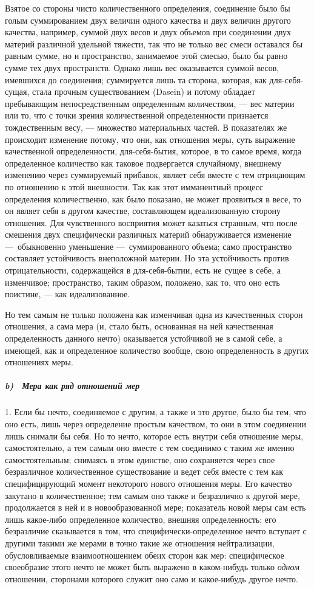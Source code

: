 Взятое со стороны чисто количественного определения, соединение было бы
голым суммированием двух величин одного качества и двух величин другого
качества, например, суммой двух весов и двух объемов при соединении двух
материй различной удельной тяжести, так что не только вес смеси оставался
бы равным сумме, но и пространство, занимаемое этой смесью, было бы равно
сумме тех двух пространств. Однако лишь вес оказывается суммой весов,
имевшихся до соединения; суммируется лишь та сторона, которая, как
для-себя-сущая, стала прочным существованием (Dasein) и потому обладает
пребывающим непосредственным определенным количеством, — вес материи или
то, что с точки зрения количественной определенности признается
тождественным весу, — множество материальных частей. В показателях же
происходит изменение потому, что они, как отношения меры, суть выражение
качественной определенности, для-себя-бытия, которое, в то самое время,
когда определенное количество как таковое подвергается случайному, внешнему
изменению через суммируемый прибавок, являет себя вместе с тем отрицающим
по отношению к этой внешности. Так как этот имманентный процесс определения
количественно, как было показано, не может проявиться в весе, то он являет
себя в другом качестве, составляющем идеализованную сторону отношения. Для
чувственного восприятия может казаться странным, что после смешения двух
специфически различных материй обнаруживается изменение —~обыкновенно
уменьшение —~суммированного объема; само пространство составляет
устойчивость внеположной материи. Но эта устойчивость против
отрицательности, содержащейся в для-себя-бытии, есть не сущее в себе, а
изменчивое; пространство, таким образом, положено, как то, что оно есть
поистине, — как идеализованное.

Но тем самым не только положена как изменчивая одна из качественных сторон
отношения, а сама мера (и, стало быть, основанная на ней качественная
определенность данного нечто) оказывается устойчивой не в самой себе, а
имеющей, как и определенное количество вообще, свою определенность в других
отношениях меры.

\subparagraph[b) \ Мера как ряд отношений мер]{b) \ Мера как ряд отношений
мер}
\hypertarget{Toc478978683}{}1. Если бы нечто, соединяемое с другим, а также
и это другое, было бы тем, что оно есть, лишь через определение простым
качеством, то они в этом соединении лишь снимали бы себя. Но то нечто,
которое есть внутри себя отношение меры, самостоятельно, а тем самым оно
вместе с тем соединимо с таким же именно самостоятельным; снимаясь в этом
единстве, оно сохраняется через свое безразличное количественное
существование и ведет себя вместе с тем как специфицирующий момент
некоторого нового отношения меры. Его качество закутано в количественное;
тем самым оно также и безразлично к другой мере, продолжается в ней и в
новообразованной мере; показатель новой меры сам есть лишь какое-либо
определенное количество, внешняя определенность; его безразличие
сказывается в том, что специфически-определенное нечто вступает с другими
такими же мерами в точно такие же отношения нейтрализации, обусловливаемые
взаимоотношением обеих сторон как мер: специфическое своеобразие этого
нечто не может быть выражено в каком-нибудь только
{\em одном} отношении, сторонами которого служит оно
само и какое-нибудь другое нечто.

